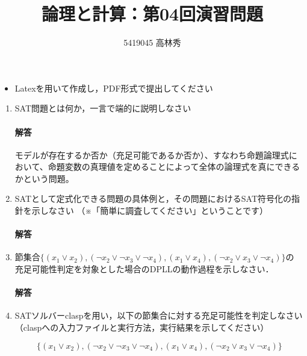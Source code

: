 \documentclass[dvipdfmx]{jsarticle}
\def\NO{04}
\def\LECTURENAME{論理と計算}
\begin{document}
\title{\LECTURENAME{}：第\NO{}回演習問題}

\author{5419045 高林秀}

\date{}
\maketitle

\begin{itemize}
\item Latexを用いて作成し，PDF形式で提出してください
\end{itemize}


\vspace*{\baselineskip}

\begin{enumerate}\setlength{\itemsep}{\baselineskip}

\item SAT問題とは何か，一言で端的に説明しなさい
\paragraph{解答}\par
モデルが存在するか否か（充足可能であるか否か）、すなわち命題論理式において、命題変数の真理値を定めることによって全体の論理式を真にできるかという問題。

\item SATとして定式化できる問題の具体例と，その問題におけるSAT符号化の指針を示しなさい
  （※「簡単に調査してください」ということです）
\paragraph{解答}\par



\item 節集合$\{(x_1\lor x_2), (\neg x_2 \lor \neg x_3\lor  \neg x_4), (x_1\lor x_4), (\neg x_2\lor x_3\lor \neg x_4)\}$の
  充足可能性判定を対象とした場合のDPLLの動作過程を示しなさい．
\paragraph{解答}




\item SATソルバーclaspを用い，以下の節集合に対する充足可能性を判定しなさい
（claspへの入力ファイルと実行方法，実行結果を示してください）

\[
\{(x_1\lor x_2), (\neg x_2 \lor \neg x_3\lor  \neg x_4), (x_1\lor x_4), (\neg x_2\lor x_3\lor \neg x_4)\}
\]

\end{enumerate}
\end{document}
